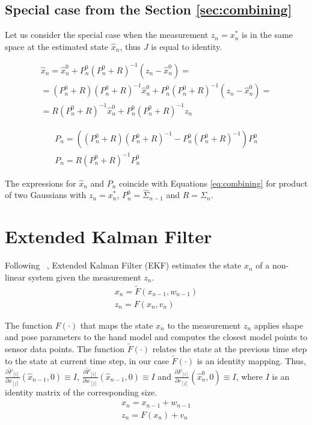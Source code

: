 \subsection{Special case from the Section  \ref{sec:combining}}
Let us consider the special case when the measurement $z_n = x_n^*$ is in the same space at the estimated state $\hat{x}_n$, thus $J$ is equal to identity.

\begin{align*}
\hat{x}_n = \hat{x}_n^0 + P_n^0  (P_n^0 + R)^{-1}(z_n - \hat{x}_n^0) = \\
= (P_n^0 + R)(P_n^0 + R)^{-1}\hat{x}_n^0 + P_n^0  (P_n^0 + R)^{-1}(z_n - \hat{x}_n^0) = \\
= R(P_n^0 + R)^{-1}\hat{x}_n^0 + P_n^0  (P_n^0 + R)^{-1}z_n 
 \end{align*}

\begin{align*}
P_n = ((P_n^0 + R) (P_n^0 + R)^{-1} - P_n^0  (P_n^0 + R)^{-1}) P_n^0\\
P_n = R (P_n^0 + R)^{-1} P_n^0
\end{align*}

The expressions for $\hat{x}_n$ and $P_n$ coincide with Equations \ref{eq:combining} for product of two Gaussians  with $z_n = x_n^*$, $P_n^0 = \hat{\Sigma}_{n - 1}$ and $R = \Sigma_{n}$.

\section{Extended Kalman Filter}

Following ~\cite{welch1995introduction}, Extended Kalman Filter (EKF) estimates the state $x_n$  of a non-linear system given the measurement $z_n$.
\begin{align}
x_n = \tilde{F}(x_{n - 1},  w_{n - 1}) \\
z_n = F(x_n, v_n)
\end{align}

The function $F(\cdot)$ that maps the state $x_n$ to the measurement $z_n$ applies shape and pose parameters to the hand model and computes the closest model points to sensor data points. 
The function $\tilde{F}(\cdot)$ relates the state at the previous time step to the state at current time step, in our case $\tilde{F}(\cdot)$ is an identity mapping. Thus, $\frac{ \partial \tilde{F}_{[i]}}{ \partial x_{[j]}}(\hat{x}_{n - 1}, 0) \equiv I$, 
$\frac{ \partial \tilde{F}_{[i]}}{ \partial w_{[j]}}(\hat{x}_{n - 1}, 0) \equiv I$ and $\frac{ \partial F_{[i]}}{ \partial v_{[j]}}(\hat{x}_n^0, 0) \equiv I$, where $I$ is an identity matrix of the corresponding size.
\begin{align}
x_n = x_{n - 1} + w_{n - 1} \\
z_n = F(x_n) + v_n 
\end{align}



